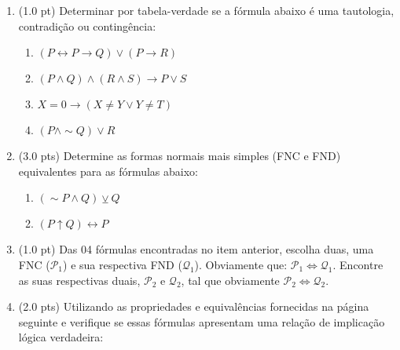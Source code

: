 \documentclass[12pt]{article}
\begin{document}
\begin{enumerate}

\item (1.0 pt) Determinar por tabela-verdade se a fórmula abaixo é uma tautologia, contradição ou contingência: 

\begin{enumerate}
\setlength{\itemsep}{-2pt}
\item $(P \leftrightarrow P \rightarrow Q) \vee (P \rightarrow R)$

\item $(P \wedge Q) \wedge (R \wedge S) \rightarrow P \vee S$

\item $X = 0 \rightarrow (X \neq Y \vee Y \neq T)$

\item $(P \wedge \sim Q) \vee R$
\end{enumerate}


\item (3.0 pts) Determine as formas normais mais simples (FNC e FND) equivalentes para as fórmulas abaixo: 
\begin{enumerate}
\setlength{\itemsep}{-5pt}

\item $(\sim P \wedge Q) \veebar Q$

\item $(P \uparrow Q) \leftrightarrow P$
\end{enumerate}

\item (1.0 pt) Das 04 fórmulas
encontradas no item anterior, escolha duas, uma 
FNC ($\mathcal{P}_1$) e sua respectiva FND ($\mathcal{Q}_1$). Obviamente que: $\mathcal{P}_1 \Leftrightarrow \mathcal{Q}_1$. 
Encontre as suas respectivas duais,
$\mathcal{P}_2$ e $\mathcal{Q}_2$,  tal que obviamente 
$\mathcal{P}_2 \Leftrightarrow \mathcal{Q}_2$.


\item (2.0 pts) Utilizando as propriedades e equivalências
fornecidas na página seguinte
e verifique  se essas fórmulas apresentam uma relaç\~ao de implicaç\~ao lógica  verdadeira:

\begin{enumerate}
\setlength{\itemsep}{-2pt}





\end{enumerate}
\end{enumerate}
\end{document}
